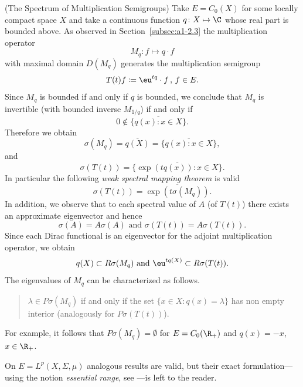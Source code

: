 \begin{example}{(The Spectrum of Multiplication Semigroups)}\label{ex:a3-2.3}%
Take $E = C_{0}(X)$ for some locally compact space $X$ and take a continuous function $q \colon X \mapsto \C$ whose real part is bounded above.
As observed in Section~\ref{subsec:a1-2.3} the multiplication operator
\[
M_{q} \colon f \mapsto q \cdot f
\]
with maximal domain $D(M_{q})$ generates the multiplication semigroup
\[
T(t)f \coloneqq \eu^{tq} \cdot f \, , \, f \in E .
\]
Since $M_{q}$ is bounded if and only if\/ $q$ is bounded, we conclude that $M_{q}$ is invertible (with bounded inverse $M_{1/q}$) if and only if
\[
0 \notin \overline{\{q(x)  \colon x \in X\}} .
\]
Therefore we obtain
\[
\sigma(M_{q}) = \overline{q(X)} = \overline{\{q(x) \colon x \in X\}} ,
\]
and
\[
\sigma(T(t)) = \overline{\{\exp(tq(x)) \colon x \in X\}} .
\]
In particular the following \emph{weak spectral mapping theorem}
is valid
\[
\sigma(T(t)) = \overline{\exp(t\sigma(M_{q}))} .
\]
In addition, we observe that to each spectral value of\/ $A$ (\resp of\/ $T(t)$) there exists an approximate eigenvector and hence
\[
\sigma(A) = A\sigma(A) \text{ and } \sigma(T(t)) = A\sigma(T(t)) .
\]
Since each Dirac functional is an eigenvector for the adjoint multiplication operator, we obtain
\[
q(X) \subset R\sigma(M_{q}) \text{ and } \eu^{tq(X)} \subset R\sigma(T(t)) .
\]
The eigenvalues of\/ $M_{q}$ can be characterized as follows.
\begin{quote}
$\lambda \in P\sigma(M_{q})$ if and only if the set $\{x \in X \colon q(x) = \lambda\}$ has non empty interior (analogously for $P\sigma(T(t))$).
\end{quote}
For example, it follows that $P\sigma(M_{q}) = \emptyset$ for $E = C_{0}(\R_{+})$ and $q(x) = -x$, $x \in \R_{+}$.

On $E = L^{p}(X,\Sigma,\mu)$ analogous results are valid, but their exact formulation---using the notion \emph{essential range}, see \textcite{goldstein:1985a}---is left to the reader.
\end{example}
